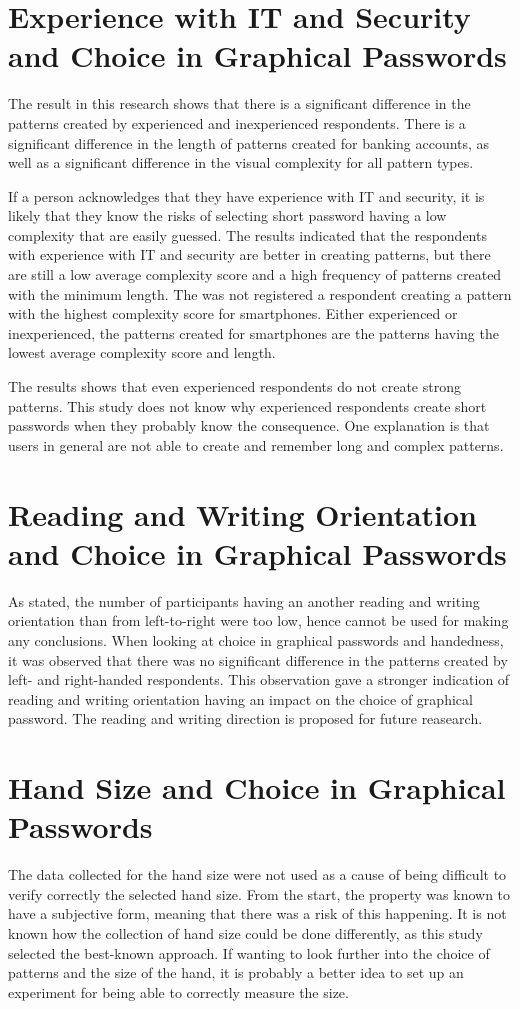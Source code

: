   \section{Experience with IT and Security and Choice in Graphical Passwords}
    
    The result in this research shows that there is a significant difference in the patterns created by experienced and inexperienced respondents. There is a significant difference in the length of patterns created for banking accounts, as well as a significant difference in the visual complexity for all pattern types. 

    If a person acknowledges that they have experience with IT and security, it is likely that they know the risks of selecting short password having a low complexity that are easily guessed. The results indicated that the respondents with experience with IT and security are better in creating patterns, but there are still a low average complexity score and a high frequency of patterns created with the minimum length. The was not registered a respondent creating a pattern with the highest complexity score for smartphones. Either experienced or inexperienced, the patterns created for smartphones are the patterns having the lowest average complexity score and length.

    The results shows that even experienced respondents do not create strong patterns. This study does not know why experienced respondents create short passwords when they probably know the consequence. One explanation is that users in general are not able to create and remember long and complex patterns. 

  \section{Reading and Writing Orientation and Choice in Graphical Passwords}
    As stated, the number of participants having an another reading and writing orientation than from left-to-right were too low, hence cannot be used for making any conclusions. When looking at choice in graphical passwords and handedness, it was observed that there was no significant difference in the patterns created by left- and right-handed respondents. This observation gave a stronger indication of reading and writing orientation having an impact on the choice of graphical password. The reading and writing direction is proposed for future reasearch. 

  \section{Hand Size and Choice in Graphical Passwords}
    The data collected for the hand size were not used as a cause of being difficult to verify correctly the selected hand size. From the start, the property was known to have a subjective form, meaning that there was a risk of this happening. It is not known how the collection of hand size could be done differently, as this study selected the best-known approach. If wanting to look further into the choice of patterns and the size of the hand, it is probably a better idea to set up an experiment for being able to correctly measure the size. 

